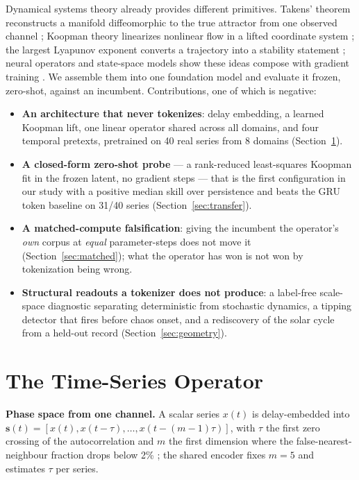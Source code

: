 \documentclass{article}
\begin{document}
Dynamical systems theory already provides different primitives. Takens'
theorem reconstructs a manifold diffeomorphic to the true attractor from one
observed channel \cite{takens1981,kennel1992}; Koopman theory linearizes
nonlinear flow in a lifted coordinate system
\cite{koopman1931,mezic2005,williams2015,lusch2018}; the largest Lyapunov
exponent converts a trajectory into a stability statement
\cite{wolf1985,lorenz1963}; neural operators and state-space models show these
ideas compose with gradient training \cite{li2021fno,chen2018node,gu2023mamba}.
We assemble them into one foundation model and evaluate it frozen, zero-shot,
against an incumbent. Contributions, one of which is negative:
\begin{itemize}\itemsep1pt
\item \textbf{An architecture that never tokenizes}: delay embedding, a
learned Koopman lift, one linear operator shared across all domains, and four
temporal pretexts, pretrained on 40 real series from 8 domains
(Section~\ref{sec:method}).
\item \textbf{A closed-form zero-shot probe} --- a rank-reduced least-squares
Koopman fit in the frozen latent, no gradient steps --- that is the first
configuration in our study with a positive median skill over persistence and
beats the GRU token baseline on 31/40 series (Section~\ref{sec:transfer}).
\item \textbf{A matched-compute falsification}: giving the incumbent the
operator's \emph{own} corpus at \emph{equal} parameter-steps does not move it
(Section~\ref{sec:matched}); what the operator has won is not won by
tokenization being wrong.
\item \textbf{Structural readouts a tokenizer does not produce}: a label-free
scale-space diagnostic separating deterministic from stochastic dynamics, a
tipping detector that fires before chaos onset, and a rediscovery of the solar
cycle from a held-out record (Section~\ref{sec:geometry}).
\end{itemize}

\section{The Time-Series Operator}
\label{sec:method}
\textbf{Phase space from one channel.} A scalar series $x(t)$ is delay-embedded
into $\mathbf{s}(t)=[x(t),x(t-\tau),\dots,x(t-(m-1)\tau)]$, with $\tau$ the
first zero crossing of the autocorrelation and $m$ the first dimension where the
false-nearest-neighbour fraction drops below 2\% \cite{takens1981,kennel1992};
the shared encoder fixes $m{=}5$ and estimates $\tau$ per series.
\end{document}
